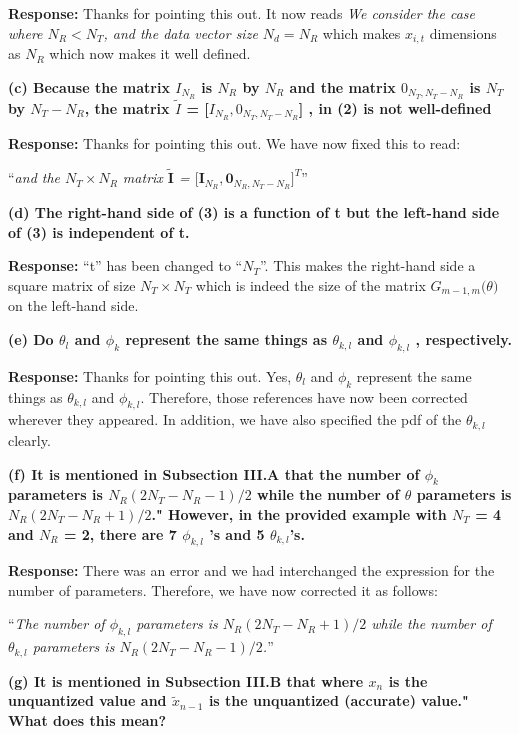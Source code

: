 \documentclass[12pt]{letter}
\begin{document}
\textbf{Response:} Thanks for pointing this out.  It now reads
\emph{We consider the case where $N_R < N_T$, and the data vector size
  $N_d = N_R$} which makes $x_{i,t}$ dimensions as $N_R$ which now
makes it well defined.

\textbf{(c) Because the matrix $I_{N_R}$ is $N_R$ by $N_R$ and the
  matrix $0_{N_T , N_T - N_R }$ is $N_T$ by $N_T - N_R$, the matrix
  $\tilde{I}$ = [$I_{N_R}, 0_{N_T, N_T - N_R }$] , in (2) is not
  well-defined}

\textbf{Response:} Thanks for pointing this out.  We have now fixed
this to read:

``\emph{and the $N_T \times N_R$ matrix
  $\tilde{\textbf{I}}$ =
  $\big[\textbf{I}_{N_R }, {\boldsymbol{0}}_{N_R ,N_T
    -N_R}\big]^{T}$}''

\textbf{(d) The right-hand side of (3) is a function of t but the left-hand side of (3) is independent of t.}

\textbf{Response:} ``t'' has been changed to ``$N_T$''. This makes the
right-hand side a square matrix of size $N_T \times N_T$ which is
indeed the size of the matrix $G_{m-1,m}\big(\theta\big)$ on the
left-hand side.

\textbf{(e) Do $\theta_l$ and $\phi_k$ represent the same things as $\theta_{k,l}$ and $\phi_{k,l}$ , respectively.}

\textbf{Response:} Thanks for pointing this out. Yes, $\theta_l$ and
$\phi_k$ represent the same things as $\theta_{k,l}$ and
$\phi_{k,l}$. Therefore, those references have now been corrected
wherever they appeared. In addition, we have also specified the pdf of
the $\theta_{k,l}$ clearly.

\textbf{(f) It is mentioned in Subsection III.A that the number of
  $\phi_k$ parameters is $N_R(2N_T - N_R -1 )/2$ while the number of
  $\theta$ parameters is $N_R(2N_T -N_R + 1)/2$." However, in the
  provided example with $N_T$ = 4 and $N_R$ = 2, there are 7
  $\phi_{k,l}$ 's and 5 $\theta_{k,l}$'s.}

\textbf{Response:} There was an error and we had interchanged the
expression for the number of parameters. Therefore, we have now
corrected it as follows:

``\emph{The number of $\phi_{k,l}$ parameters is
  $N_{R}(2N_{T} - N_{R}+1)/2$ while the number of $\theta_{k,l}$
  parameters is $N_{R}(2N_{T} - N_{R}-1)/2$.}''

\textbf{(g) It is mentioned in Subsection III.B that where $x_n$ is the unquantized value and $\tilde{x}_{n-1}$ is the unquantized (accurate) value." What does this mean?}
\end{document}
